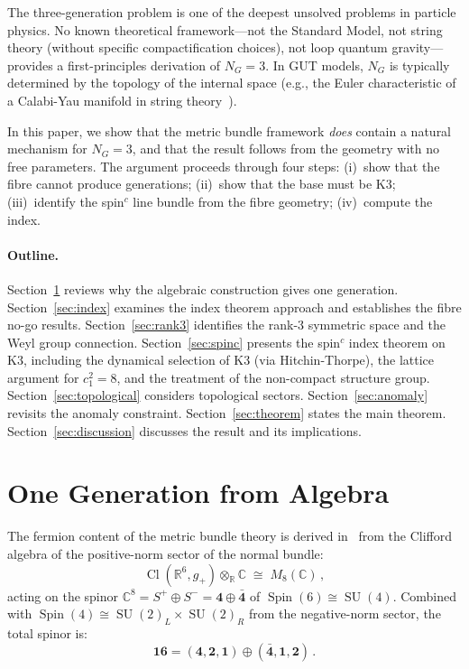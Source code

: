 \documentclass[12pt,a4paper]{article}
\theoremstyle{definition}
\newcommand{\SU}{\operatorname{SU}}
\newcommand{\Spin}{\operatorname{Spin}}
\newcommand{\Cl}{\operatorname{Cl}}
\newcommand{\R}{\mathbb{R}}
\newcommand{\C}{\mathbb{C}}
\begin{document}
The three-generation problem is one of the deepest unsolved problems in particle physics.
No known theoretical framework---not the Standard Model, not string theory (without specific compactification choices), not loop quantum gravity---provides a first-principles derivation of $N_G = 3$.
In GUT models, $N_G$ is typically determined by the topology of the internal space (e.g., the Euler characteristic of a Calabi-Yau manifold in string theory~\cite{CHSW1985}).

In this paper, we show that the metric bundle framework \emph{does} contain a natural mechanism for $N_G = 3$, and that the result follows from the geometry with no free parameters.
The argument proceeds through four steps: (i)~show that the fibre cannot produce generations; (ii)~show that the base must be K3; (iii)~identify the spin$^c$ line bundle from the fibre geometry; (iv)~compute the index.

\paragraph{Outline.}
Section~\ref{sec:algebraic} reviews why the algebraic construction gives one generation.
Section~\ref{sec:index} examines the index theorem approach and establishes the fibre no-go results.
Section~\ref{sec:rank3} identifies the rank-3 symmetric space and the Weyl group connection.
Section~\ref{sec:spinc} presents the spin$^c$ index theorem on K3, including the dynamical selection of K3 (via Hitchin-Thorpe), the lattice argument for $c_1^2 = 8$, and the treatment of the non-compact structure group.
Section~\ref{sec:topological} considers topological sectors.
Section~\ref{sec:anomaly} revisits the anomaly constraint.
Section~\ref{sec:theorem} states the main theorem.
Section~\ref{sec:discussion} discusses the result and its implications.


\section{One Generation from Algebra}
\label{sec:algebraic}

The fermion content of the metric bundle theory is derived in~\cite{Paper2} from the Clifford algebra of the positive-norm sector of the normal bundle:
\begin{equation}
\Cl(\R^6, g_+) \otimes_\R \C \;\cong\; M_8(\C)\,,
\end{equation}
acting on the spinor $\C^8 = S^+ \oplus S^- = \mathbf{4} \oplus \bar{\mathbf{4}}$ of $\Spin(6) \cong \SU(4)$.
Combined with $\Spin(4) \cong \SU(2)_L \times \SU(2)_R$ from the negative-norm sector, the total spinor is:
\begin{equation}
\mathbf{16} = (\mathbf{4}, \mathbf{2}, \mathbf{1}) \oplus (\bar{\mathbf{4}}, \mathbf{1}, \mathbf{2})\,.
\end{equation}
\end{document}
